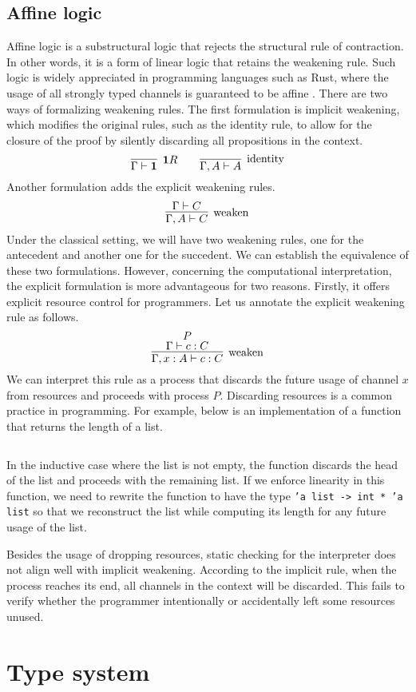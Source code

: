 \documentclass[12pt, openany]{memoir}
\begin{document}
\section{Affine logic}
Affine logic is a substructural logic that rejects the structural rule of contraction. 
In other words, it is a form of linear logic that retains the weakening rule. 
Such logic is widely appreciated in programming languages such as Rust,
where the usage of all strongly typed channels is guaranteed to be affine \cite{Lagaillardie2022}.
There are two ways of formalizing weakening rules. 
The first formulation is implicit weakening, which modifies the original rules, 
such as the identity rule, to allow for the closure of the proof by silently discarding all propositions in the context.
\[
  \infer[\textbf{1}R]{\Gamma \vdash \textbf{1}}{}
  \qquad
  \infer[\text{identity}]{\Gamma, A \vdash A}{}
\]
Another formulation adds the explicit weakening rules.
\[
  \infer[\text{weaken}]{\Gamma, A \vdash C}{\Gamma \vdash C}
\]
Under the classical setting, we will have two weakening rules, one for the antecedent and another one for the succedent.
We can establish the equivalence of these two formulations. 
However, concerning the computational interpretation, the explicit formulation 
is more advantageous for two reasons.
Firstly, it offers explicit resource control for programmers. 
Let us annotate the explicit weakening rule as follows.
\[
  \infer[\text{weaken}]{\Gamma, x : A \vdash c : C}{
    \deduce{\Gamma \vdash c : C}{P}
  }
\]
We can interpret this rule as a process that discards the future usage of channel $x$ from resources and proceeds with process $P$. 
Discarding resources is a common practice in programming. For example, below is an implementation of a function that returns the length of a list.
\inputminted{ocaml}{code/length.ml}
In the inductive case where the list is not empty, 
the function discards the head of the list and proceeds with the remaining list. 
If we enforce linearity in this function, 
we need to rewrite the function to have the type \texttt{'a list -> int * 'a list}
so that we reconstruct the list while computing its length for any future usage of the list.  

Besides the usage of dropping resources, static checking for the interpreter does not align well with implicit weakening. 
According to the implicit rule, when the process reaches its end, all channels in the context will be discarded. 
This fails to verify whether the programmer intentionally or accidentally left some resources unused.
\chapter{Type system}
\end{document}
